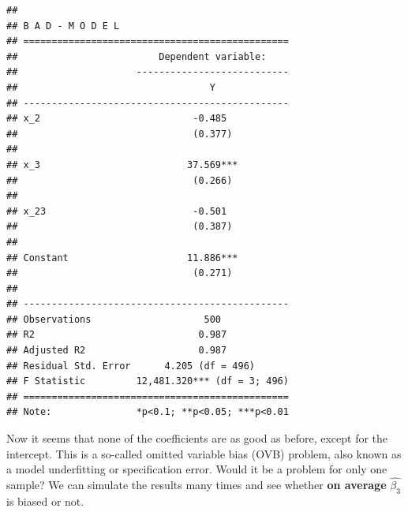\documentclass[
]{book}
\newenvironment{Shaded}{\begin{snugshade}}{\end{snugshade}}
\newcommand{\AttributeTok}[1]{\textcolor[rgb]{0.77,0.63,0.00}{#1}}
\newcommand{\CommentTok}[1]{\textcolor[rgb]{0.56,0.35,0.01}{\textit{#1}}}
\newcommand{\ConstantTok}[1]{\textcolor[rgb]{0.00,0.00,0.00}{#1}}
\newcommand{\ControlFlowTok}[1]{\textcolor[rgb]{0.13,0.29,0.53}{\textbf{#1}}}
\newcommand{\DecValTok}[1]{\textcolor[rgb]{0.00,0.00,0.81}{#1}}
\newcommand{\FunctionTok}[1]{\textcolor[rgb]{0.00,0.00,0.00}{#1}}
\newcommand{\NormalTok}[1]{#1}
\newcommand{\OtherTok}[1]{\textcolor[rgb]{0.56,0.35,0.01}{#1}}
\newcommand{\SpecialCharTok}[1]{\textcolor[rgb]{0.00,0.00,0.00}{#1}}
\newcommand{\StringTok}[1]{\textcolor[rgb]{0.31,0.60,0.02}{#1}}
\begin{document}
\begin{verbatim}
## 
## B A D - M O D E L
## ===============================================
##                         Dependent variable:    
##                     ---------------------------
##                                  Y             
## -----------------------------------------------
## x_2                           -0.485           
##                               (0.377)          
##                                                
## x_3                          37.569***         
##                               (0.266)          
##                                                
## x_23                          -0.501           
##                               (0.387)          
##                                                
## Constant                     11.886***         
##                               (0.271)          
##                                                
## -----------------------------------------------
## Observations                    500            
## R2                             0.987           
## Adjusted R2                    0.987           
## Residual Std. Error      4.205 (df = 496)      
## F Statistic         12,481.320*** (df = 3; 496)
## ===============================================
## Note:               *p<0.1; **p<0.05; ***p<0.01
\end{verbatim}

Now it seems that none of the coefficients are as good as before, except for the intercept. This is a so-called omitted variable bias (OVB) problem, also known as a model underfitting or specification error. Would it be a problem for only one sample? We can simulate the results many times and see whether \textbf{on average} \(\hat{\beta_3}\) is biased or not.

\begin{Shaded}
\end{Shaded}
\end{document}
